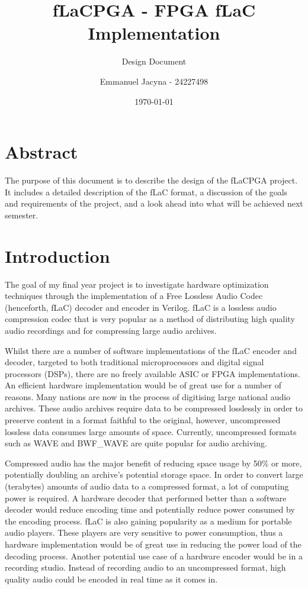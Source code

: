 \documentclass[12pt]{scrartcl}
\title{fLaCPGA - FPGA fLaC Implementation}
\subtitle{Design Document}
\author{Emmanuel Jacyna - 24227498}
\date{\today}
\begin{document}
\pagestyle{myheadings}
  \maketitle
  \begin{figure}[H]
  \end{figure}
  
  \tableofcontents
  
  \section*{Abstract}
  The purpose of this document is to describe the design of the fLaCPGA project. It includes a detailed description of the fLaC format, a discussion of the goals and requirements of the project, and a look ahead into what will be achieved next semester.
  
  
  \section{Introduction}
  The goal of my final year project is to investigate hardware optimization techniques through the implementation of a Free Lossless Audio Codec (henceforth, fLaC) decoder and encoder in Verilog. fLaC is a lossless audio compression codec that is very popular as a method of distributing high quality audio recordings and for compressing large audio archives\cite{flac_popular}. 
  
  Whilst there are a number of software implementations of the fLaC encoder and decoder, targeted to both traditional microprocessors and digital signal processors (DSPs), there are no freely available ASIC or FPGA implementations. An efficient hardware implementation would be of great use for a number of reasons. Many nations are now in the process of digitising large national audio archives. These audio archives require data to be compressed losslessly in order to preserve content in a format faithful to the original, however, uncompressed lossless data consumes large amounts of space. Currently, uncompressed formats such as WAVE and BWF\_WAVE are quite popular for audio archiving\cite{pres_fmts}. 
  
  Compressed audio has the major benefit of reducing space usage by 50\% or more, potentially doubling an archive's potential storage space. In order to convert large (terabytes) amounts of audio data to a compressed format, a lot of computing power is required. A hardware decoder that performed better than a software decoder would reduce encoding time and potentially reduce power consumed by the encoding process. fLaC is also gaining popularity as a medium for portable audio players. These players are very sensitive to power consumption, thus a hardware implementation would be of great use in reducing the power load of the decoding process. Another potential use case of a hardware encoder would be in a recording studio. Instead of recording audio to an uncompressed format, high quality audio could be encoded in real time as it comes in.
  
\end{document}
